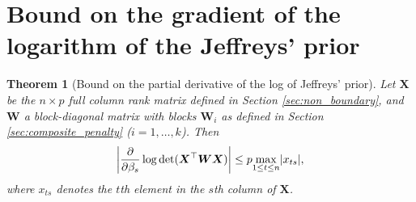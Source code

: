 \documentclass[11pt, a4paper]{article}
\newcommand*{\bb}{\boldsymbol}
\theoremstyle{example} \newtheorem{example}{Example}[section]
\theoremstyle{theorem} \newtheorem{theorem}{Theorem}[section]
\def\det{{\mathop{\rm det}}}
\def\bX{\bb{X}}
\def\bW {\bb{W}}
\begin{document}
\section{Bound on the gradient of the logarithm of the Jeffreys' prior}
\begin{theorem}[Bound on the partial derivative of the log of Jeffreys'  prior]\label{thm:jeffrey_deriv_bound}
	Let $\bb X $ be the $n\times p$ full column rank matrix defined in Section \ref{sec:non_boundary}, and $\bb W$ a block-diagonal matrix with blocks $\bW_i$ as defined in Section \ref{sec:composite_penalty} ($i=1,\ldots,k$). Then 
\[        
  \left|\frac{\partial }{\partial  \beta_s}\log \det(\bb X^\top\bb W\bb X)\right| \leq p\underset{1\leq t\leq n}{\max} |x_{ts}|, 
\]
where $x_{ts}$ denotes the $t$th element in the $s$th column of $\bX$.
\end{theorem}
\end{document}
